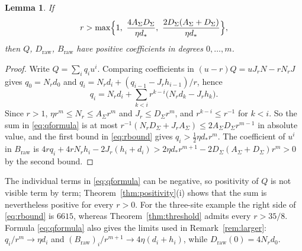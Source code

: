 \documentclass[11pt]{article}
\theoremstyle{plain}
\newtheorem{lemma}[theorem]{Lemma}
\theoremstyle{definition}
\theoremstyle{remark}
\numberwithin{equation}{section}
\newcommand{\raw}{\mathrm{raw}}
\begin{document}
\begin{lemma}\label{lem:crude}
If
\begin{equation}\label{eq:rbound}
 r>\max\Bigl\{1,\ \frac{4A_\Sigma D_\Sigma}{\eta d_\ast},\
 \frac{2D_\Sigma(A_\Sigma+D_\Sigma)}{\eta d_\ast}\Bigr\},
\end{equation}
then \(Q\), \(D_{\raw}\), \(B_{\raw}\) have positive coefficients in degrees \(0,\dots,m\).
\end{lemma}
\begin{proof}
Write \(Q=\sum_iq_iu^i\). Comparing coefficients in \((u-r)Q=uJ_rN-rN_rJ\) gives
\(q_0=N_rd_0\) and \(q_i=N_rd_i+(q_{i-1}-J_rh_{i-1})/r\), hence
\begin{equation}\label{eq:qformula}
 q_i=N_rd_i+\sum_{k<i}r^{k-i}\bigl(N_rd_k-J_rh_k\bigr).
\end{equation}
Since \(r>1\), \(\eta r^m\le N_r\le A_\Sigma r^m\) and \(J_r\le D_\Sigma r^m\), and
\(r^{k-i}\le r^{-1}\) for \(k<i\). So the sum in \eqref{eq:qformula} is at most
\(r^{-1}(N_rD_\Sigma+J_rA_\Sigma)\le2A_\Sigma D_\Sigma r^{m-1}\) in absolute value, and the
first bound in \eqref{eq:rbound} gives \(q_i>\tfrac12\eta d_\ast r^m\). The coefficient of
\(u^i\) in \(B_{\raw}\) is
\(4rq_i+4rN_rh_i-2J_r(h_i+d_i)>2\eta d_\ast r^{m+1}-2D_\Sigma(A_\Sigma+D_\Sigma)r^m>0\) by
the second bound.
\end{proof}

The individual terms in \eqref{eq:qformula} can be negative, so positivity of \(Q\) is not
visible term by term; Theorem~\ref{thm:positivity}(i) shows that the sum is nevertheless
positive for every \(r>0\). For the three-site example the right side of \eqref{eq:rbound} is
\(6615\), whereas Theorem~\ref{thm:threshold} admits every \(r>35/8\). Formula
\eqref{eq:qformula} also gives the limits used in Remark~\ref{rem:larger}:
\(q_i/r^m\to\eta d_i\) and \((B_{\raw})_i/r^{m+1}\to4\eta(d_i+h_i)\), while
\(D_{\raw}(0)=4N_rd_0\).



\end{document}
